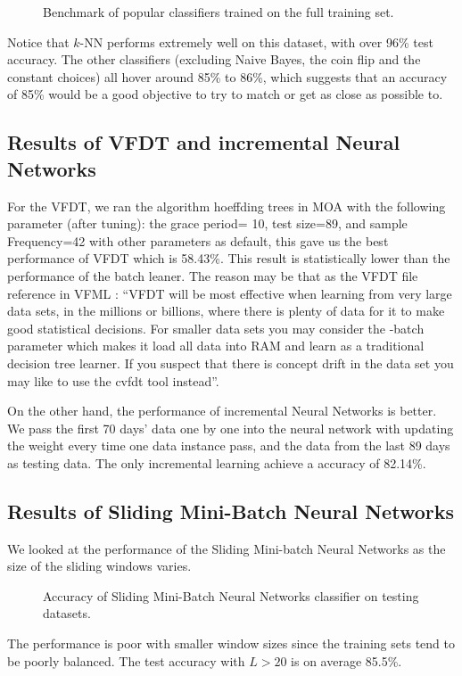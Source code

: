 \documentclass[conference]{IEEEtran}
\begin{document}
		\begin{figure}[H]
			\centering
			\caption{Benchmark of popular classifiers trained on the full training set.}
			\label{fig:benchmark}
		\end{figure}
		
		Notice that $k$-NN performs extremely well on this dataset, with over 96\% test accuracy. The other classifiers (excluding Naive Bayes, the coin flip and the constant choices) all hover around 85\% to 86\%, which suggests that an accuracy of 85\% would be a good objective to try to match or get as close as possible to.
		
		\subsection{Results of VFDT and incremental Neural Networks}
		For the VFDT, we ran the algorithm hoeffding trees in MOA with the following parameter (after tuning): the grace period= 10, test size=89, and sample Frequency=42 with other parameters as default, this gave us the best performance of VFDT which is 58.43\%. This result is statistically lower than the performance of the batch leaner.
		The reason may be that as the VFDT file reference in VFML \cite{VFML}: ``VFDT  will be most effective when learning from very large data sets, in the millions or billions, where there is plenty of data for it to make good statistical decisions. For smaller data sets you may consider the -batch parameter which makes it load all data into RAM and learn as a traditional decision tree learner. If you suspect that there is concept drift in the data set you may like to use the cvfdt tool instead''.
		
		On the other hand, the performance of incremental Neural Networks is better. We pass the first 70 days' data one by one into the neural network with updating the weight every time one data instance pass, and the data from the last 89 days as testing data. The only incremental learning achieve a accuracy of 82.14\%.
		
		\subsection{Results of Sliding Mini-Batch Neural Networks}
		
		We looked at the performance of the Sliding Mini-batch Neural Networks as the size of the sliding windows varies.
		\begin{figure}[H]
			\centering
			\caption{Accuracy of Sliding Mini-Batch Neural Networks classifier on testing datasets.}
			\label{fig:benchmark}
		\end{figure}
		The performance is poor with smaller window sizes since the training sets tend to be poorly balanced. The test accuracy with $L > 20$ is on average 85.5\%.
		
\end{document}
